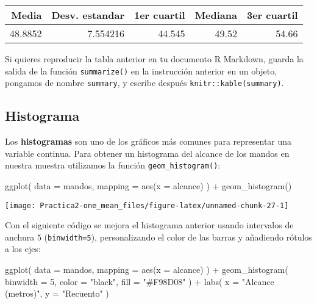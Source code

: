 \documentclass[
  degree=mecinf,
  title=normal,
  toc=normal,
  bib=normal]{mnye}
\newenvironment{Shaded}{\begin{snugshade}}{\end{snugshade}}
\newcommand{\AttributeTok}[1]{\textcolor[rgb]{0.77,0.63,0.00}{#1}}
\newcommand{\DecValTok}[1]{\textcolor[rgb]{0.00,0.00,0.81}{#1}}
\newcommand{\FunctionTok}[1]{\textcolor[rgb]{0.00,0.00,0.00}{#1}}
\newcommand{\NormalTok}[1]{#1}
\newcommand{\SpecialCharTok}[1]{\textcolor[rgb]{0.00,0.00,0.00}{#1}}
\newcommand{\StringTok}[1]{\textcolor[rgb]{0.31,0.60,0.02}{#1}}
\begin{document}
\begin{tabular}{r|r|r|r|r}
\hline
Media & Desv. estandar & 1er cuartil & Mediana & 3er cuartil\\
\hline
48.8852 & 7.554216 & 44.545 & 49.52 & 54.66\\
\hline
\end{tabular}

Si quieres reproducir la tabla anterior en tu documento R Markdown, guarda la salida de la función \texttt{summarize()} en la instrucción anterior en un objeto, pongamos de nombre \texttt{summary}, y escribe después \texttt{knitr::kable(summary)}.

\hypertarget{histogram}{%
\subsection{Histograma}\label{histogram}}

Los \textbf{histogramas} son uno de los gráficos más comunes para representar una variable continua. Para obtener un histograma del alcance de los mandos en nuestra muestra utilizamos la función \texttt{geom\_histogram()}:

\begin{Shaded}
\begin{Highlighting}[]
\FunctionTok{ggplot}\NormalTok{(}
    \AttributeTok{data =}\NormalTok{ mandos,}
    \AttributeTok{mapping =} \FunctionTok{aes}\NormalTok{(}\AttributeTok{x =}\NormalTok{ alcance)}
\NormalTok{) }\SpecialCharTok{+}
\FunctionTok{geom\_histogram}\NormalTok{() }
\end{Highlighting}
\end{Shaded}

\begin{center}\texttt{[image: Practica2-one\_mean\_files/figure-latex/unnamed-chunk-27-1]} \end{center}

Con el siguiente código se mejora el histograma anterior usando intervalos de anchura \(5\) (\texttt{binwidth=5}), personalizando el color de las barras y añadiendo rótulos a los ejes:

\begin{Shaded}
\begin{Highlighting}[]
\FunctionTok{ggplot}\NormalTok{(}
    \AttributeTok{data =}\NormalTok{ mandos,}
    \AttributeTok{mapping =} \FunctionTok{aes}\NormalTok{(}\AttributeTok{x =}\NormalTok{ alcance)}
\NormalTok{) }\SpecialCharTok{+}
\FunctionTok{geom\_histogram}\NormalTok{(}
    \AttributeTok{binwidth =} \DecValTok{5}\NormalTok{,}
    \AttributeTok{color =} \StringTok{"black"}\NormalTok{,}
    \AttributeTok{fill =} \StringTok{"\#F98D08"}
\NormalTok{) }\SpecialCharTok{+} 
\FunctionTok{labs}\NormalTok{( }
  \AttributeTok{x =} \StringTok{"Alcance (metros)"}\NormalTok{,}
  \AttributeTok{y =} \StringTok{"Recuento"}
\NormalTok{)}
\end{Highlighting}
\end{Shaded}
\end{document}
